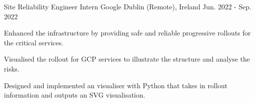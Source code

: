 

\begin{cventries}

  \cventry
    {Site Reliability Engineer Intern} %
    {Google} %
    {Dublin (Remote), Ireland} %
    {Jun. 2022 - Sep. 2022} %
    {
      \begin{cvitems} %
        \item {Enhanced the infrastructure by providing safe and reliable progressive rollouts for the critical services.}
        \item {Visualised the rollout for GCP services to illustrate the structure and analyse the risks.}
        \item {Designed and implemented an visualiser with Python that takes in rollout information and outputs an SVG visualisation.}
      \end{cvitems}
    }


\end{cventries}

